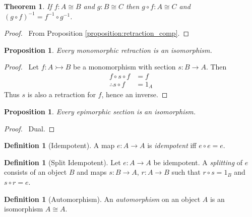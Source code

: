 \documentclass{article}
\let\qed\relax
\newtheorem{proposition}[axiom]{Proposition}
\newtheorem{thm}[axiom]{Theorem}
\theoremstyle{definition}
\newtheorem{definition}[axiom]{Definition}
\newcommand{\inv}[1]{\ensuremath{{#1}^{-1}}}
\begin{document}
\begin{thm}
    If $f : A \cong B$ and $g : B \cong C$ then $g \circ f : A \cong C$ and
    $\inv{(g \circ f)} = \inv{f} \circ \inv{g}$.
\end{thm}

\begin{proof}
    \pf\ From Proposition \ref{proposition:retraction_comp}. \qed
\end{proof}

\begin{proposition}
    Every monomorphic retraction is an isomorphism.
\end{proposition}

\begin{proof}
    \pf\ Let $f : A \rightarrowtail B$ be a monomorphism with section $s : B \rightarrow A$. Then
    \begin{align*}
        f \circ s \circ f & = f \\
        \therefore s \circ f & = 1_A
    \end{align*}
    Thus $s$ is also a retraction for $f$, hence an inverse. \qed
\end{proof}

\begin{proposition}
    Every epimorphic section is an isomorphism.
\end{proposition}

\begin{proof}
    \pf\ Dual. \qed
\end{proof}

\begin{definition}[Idempotent]
    A map $e : A \rightarrow A$ is \emph{idempotent} iff $e \circ e = e$.
\end{definition}

\begin{definition}[Split Idempotent]
    Let $e : A \rightarrow A$ be idempotent. A \emph{splitting} of $e$ consists of an object $B$ and maps
    $s : B \rightarrow A$, $r : A \rightarrow B$ such that $r \circ s = 1_B$ and $s \circ r = e$.
\end{definition}

\begin{definition}[Automorphism]
    An \emph{automorphism} on an object $A$ is an isomorphism $A \cong A$.
\end{definition}
\end{document}
